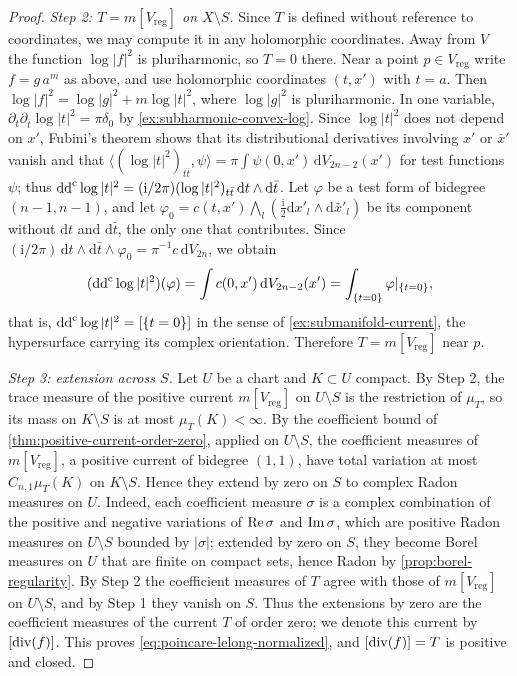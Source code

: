 \begin{proof}
\emph{Step 2: $T=m[V_{\mathrm{reg}}]$ on $X\setminus S$.} Since $T$ is defined without reference to coordinates, we may compute it in any holomorphic coordinates. Away from $V$ the function $\log|f|^2$ is pluriharmonic, so $T=0$ there. Near a point $p\in V_{\mathrm{reg}}$ write $f=g\,a^m$ as above, and use holomorphic coordinates $(t,x')$ with $t=a$. Then $\log|f|^2=\log|g|^2+m\log|t|^2$, where $\log|g|^2$ is pluriharmonic. In one variable, $\partial_t\partial_{\bar t}\log|t|^2=\pi\delta_0$ by \cref{ex:subharmonic-convex-log}. Since $\log|t|^2$ does not depend on $x'$, Fubini's theorem shows that its distributional derivatives involving $x'$ or $\bar x'$ vanish and that $\langle(\log|t|^2)_{t\bar t},\psi\rangle=\pi\int\psi(0,x')\,\mathrm dV_{2n-2}(x')$ for test functions $\psi$; thus $\mathrm{dd}^{\mathrm{c}}\log|t|^2=(\mathrm i/2\pi)(\log|t|^2)_{t\bar t}\,\mathrm dt\wedge\mathrm d\bar t$. Let $\varphi$ be a test form of bidegree $(n-1,n-1)$, and let $\varphi_0=c(t,x')\bigwedge_l(\frac{\mathrm i}2\mathrm dx'_l\wedge\mathrm d\bar x'_l)$ be its component without $\mathrm dt$ and $\mathrm d\bar t$, the only one that contributes. Since $(\mathrm i/2\pi)\,\mathrm dt\wedge\mathrm d\bar t\wedge\varphi_0=\pi^{-1}c\,\mathrm dV_{2n}$, we obtain
\[
 (\mathrm{dd}^{\mathrm{c}}\log|t|^2)(\varphi)=\int c(0,x')\,\mathrm dV_{2n-2}(x')=\int_{\{t=0\}}\varphi|_{\{t=0\}},
\]
that is, $\mathrm{dd}^{\mathrm{c}}\log|t|^2=[\{t=0\}]$ in the sense of \cref{ex:submanifold-current}, the hypersurface carrying its complex orientation. Therefore $T=m[V_{\mathrm{reg}}]$ near $p$.

\emph{Step 3: extension across $S$.} Let $U$ be a chart and $K\subset U$ compact. By Step 2, the trace measure of the positive current $m[V_{\mathrm{reg}}]$ on $U\setminus S$ is the restriction of $\mu_T$, so its mass on $K\setminus S$ is at most $\mu_T(K)<\infty$. By the coefficient bound of \cref{thm:positive-current-order-zero}, applied on $U\setminus S$, the coefficient measures of $m[V_{\mathrm{reg}}]$, a positive current of bidegree $(1,1)$, have total variation at most $C_{n,1}\mu_T(K)$ on $K\setminus S$. Hence they extend by zero on $S$ to complex Radon measures on $U$. Indeed, each coefficient measure $\sigma$ is a complex combination of the positive and negative variations of $\operatorname{Re}\sigma$ and $\operatorname{Im}\sigma$, which are positive Radon measures on $U\setminus S$ bounded by $|\sigma|$; extended by zero on $S$, they become Borel measures on $U$ that are finite on compact sets, hence Radon by \cref{prop:borel-regularity}. By Step 2 the coefficient measures of $T$ agree with those of $m[V_{\mathrm{reg}}]$ on $U\setminus S$, and by Step 1 they vanish on $S$. Thus the extensions by zero are the coefficient measures of the current $T$ of order zero; we denote this current by $[\operatorname{div}(f)]$. This proves \eqref{eq:poincare-lelong-normalized}, and $[\operatorname{div}(f)]=T$ is positive and closed.
\end{proof}

